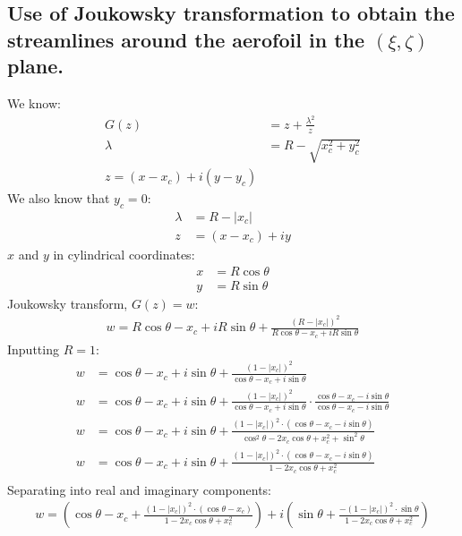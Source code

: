 \documentclass[11pt]{article}
\begin{document}
\subsection*{Use of Joukowsky transformation to obtain the streamlines around the aerofoil in the $\left(\xi, \zeta \right)$ plane.}
We know:
\begin{align}
  G(z) &= z + \frac{\lambda^2}{z}\\
  \lambda &= R - \sqrt{x_c^2 + y_c^2}\\
  z = \left(x-x_c\right) + i\left(y-y_c\right)
\end{align}
We also know that $y_c = 0$:
\begin{align}
  \lambda &= R - \left| x_c \right|\\
  z &= \left(x-x_c\right) + iy
\end{align}
$x$ and $y$ in cylindrical coordinates:
\begin{align}
  x &= R\cos\theta\\
  y &= R\sin\theta
\end{align}
Joukowsky transform, $G(z) = w$:
\begin{align}
  w = R\cos\theta - x_c + iR\sin\theta + \frac{\left(R-\left|x_c\right|\right)^2}{R\cos\theta - x_c + iR\sin\theta}
\end{align}
Inputting $R=1$:
\begin{align}
  w &= \cos\theta - x_c + i\sin\theta + \frac{\left(1-\left|x_c\right|\right)^2}{\cos\theta - x_c + i\sin\theta}\\
  w &= \cos\theta - x_c + i\sin\theta + \frac{\left(1-\left|x_c\right|\right)^2}{\cos\theta - x_c + i\sin\theta} \cdot \frac{\cos\theta - x_c - i\sin\theta}{\cos\theta - x_c - i\sin\theta}\\
  w &= \cos\theta - x_c + i\sin\theta + \frac{\left(1-\left|x_c\right|\right)^2 \cdot \left(\cos\theta - x_c - i\sin\theta\right)}{\cos^2\theta -2x_c\cos\theta + x_c^2 + \sin^2\theta}\\
  w &= \cos\theta - x_c + i\sin\theta + \frac{\left(1-\left|x_c\right|\right)^2 \cdot \left(\cos\theta - x_c - i\sin\theta\right)}{1 -2x_c\cos\theta + x_c^2}\\
\end{align}
Separating into real and imaginary components:
\begin{align}
  w = \left(\cos\theta - x_c + \frac{\left(1-\left|x_c\right|\right)^2 \cdot \left(\cos\theta - x_c\right)}{1 -2x_c\cos\theta + x_c^2}\right) + i\left(\sin\theta + \frac{-\left(1-\left|x_c\right|\right)^2 \cdot \sin\theta}{1 -2x_c\cos\theta + x_c^2}\right)
\end{align}
\end{document}
